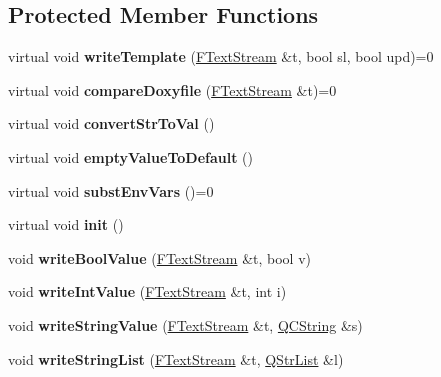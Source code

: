 \subsection*{Protected Member Functions}
\begin{DoxyCompactItemize}
\item 
\mbox{\label{class_config_option_a4af9c041d81cc919e5aae2210087bc38}} 
virtual void {\bfseries write\+Template} (\mbox{\hyperlink{class_f_text_stream}{F\+Text\+Stream}} \&t, bool sl, bool upd)=0
\item 
\mbox{\label{class_config_option_ac8e619f63a82be8d8370cd8dd1f57c16}} 
virtual void {\bfseries compare\+Doxyfile} (\mbox{\hyperlink{class_f_text_stream}{F\+Text\+Stream}} \&t)=0
\item 
\mbox{\label{class_config_option_af1d26523f37d742316ddc4c0f9add4fc}} 
virtual void {\bfseries convert\+Str\+To\+Val} ()
\item 
\mbox{\label{class_config_option_aaf0c9e86e3c98248442e907e12513dd5}} 
virtual void {\bfseries empty\+Value\+To\+Default} ()
\item 
\mbox{\label{class_config_option_aeb6ac539f2fe79e07f2baefd5c4d89c1}} 
virtual void {\bfseries subst\+Env\+Vars} ()=0
\item 
\mbox{\label{class_config_option_a1dabfad39230674fc07f5f535392fd35}} 
virtual void {\bfseries init} ()
\item 
\mbox{\label{class_config_option_a0762b14d6706667da888cd9c56c6f1e7}} 
void {\bfseries write\+Bool\+Value} (\mbox{\hyperlink{class_f_text_stream}{F\+Text\+Stream}} \&t, bool v)
\item 
\mbox{\label{class_config_option_a759c9a9621a46b28dcedd5c22a0e271f}} 
void {\bfseries write\+Int\+Value} (\mbox{\hyperlink{class_f_text_stream}{F\+Text\+Stream}} \&t, int i)
\item 
\mbox{\label{class_config_option_a6e36e0022317d91fd50398119420ad02}} 
void {\bfseries write\+String\+Value} (\mbox{\hyperlink{class_f_text_stream}{F\+Text\+Stream}} \&t, \mbox{\hyperlink{class_q_c_string}{Q\+C\+String}} \&s)
\item 
\mbox{\label{class_config_option_abd1fe2acb02bd19ed4ec67b6a60ce446}} 
void {\bfseries write\+String\+List} (\mbox{\hyperlink{class_f_text_stream}{F\+Text\+Stream}} \&t, \mbox{\hyperlink{class_q_str_list}{Q\+Str\+List}} \&l)
\end{DoxyCompactItemize}
